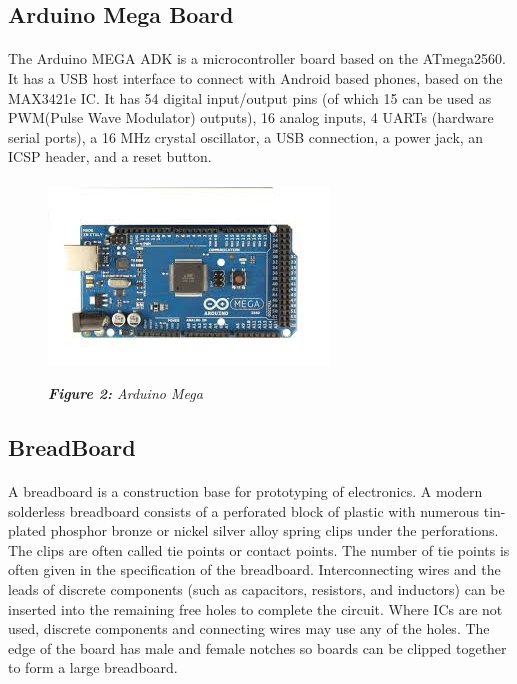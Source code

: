 \documentclass[12pt]{article}
\begin{document}
\subsection*{Arduino Mega Board}
\paragraph*{}
The Arduino MEGA ADK is a microcontroller board based on the ATmega2560. It has a USB host interface to connect with Android based phones, based on the MAX3421e IC. It has 54 digital input/output pins (of which 15 can be used as PWM(Pulse Wave Modulator) outputs), 16 analog inputs, 4 UARTs (hardware serial ports), a 16 MHz crystal oscillator, a USB connection, a power jack, an ICSP header, and a reset button.
\begin{figure}
\paragraph*{}
\includegraphics[scale=1]{mega.jpg}   %
\begin{center}
\textit{\textbf{Figure 2:} Arduino Mega}   %
\end{center}
 
\end{figure}
  
\subsection*{BreadBoard}
\paragraph*{}
A breadboard is a construction base for prototyping of electronics. A modern solderless breadboard consists of a perforated block of plastic with numerous tin-plated phosphor bronze or nickel silver alloy spring clips under the perforations. The clips are often called tie points or contact points. The number of tie points is often given in the specification of the breadboard. Interconnecting wires and the leads of discrete components (such as capacitors, resistors, and inductors) can be inserted into the remaining free holes to complete the circuit. Where ICs are not used, discrete components and connecting wires may use any of the holes. The edge of the board has male and female notches so boards can be clipped together to form a large breadboard.
\end{document}
